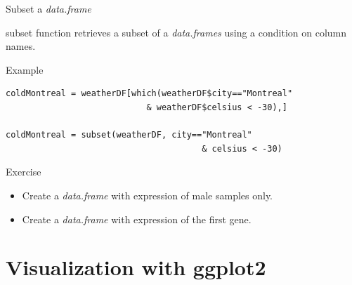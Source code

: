 \documentclass[10pt]{beamer}
\newcommand{\df}{{\it data.frame} }
\newcommand{\dfs}{{\it data.frames} }
\begin{document}
\begin{frame}[fragile]{Subset a \df}
  \begin{block}{}
    {\sf subset} function retrieves a subset of a \dfs using a condition on column names.
  \end{block}
  \begin{exampleblock}{Example}
\begin{verbatim}
coldMontreal = weatherDF[which(weatherDF$city=="Montreal" 
                            & weatherDF$celsius < -30),]

coldMontreal = subset(weatherDF, city=="Montreal" 
                                       & celsius < -30)
\end{verbatim}
  \end{exampleblock}
  \begin{alertblock}{Exercise}
    \begin{itemize}
    \item Create a \df with expression of male samples only.
    \item Create a \df with expression of the first gene.      
    \end{itemize}
  \end{alertblock}
\end{frame}




\section{Visualization with {\sf ggplot2}}
\end{document}
